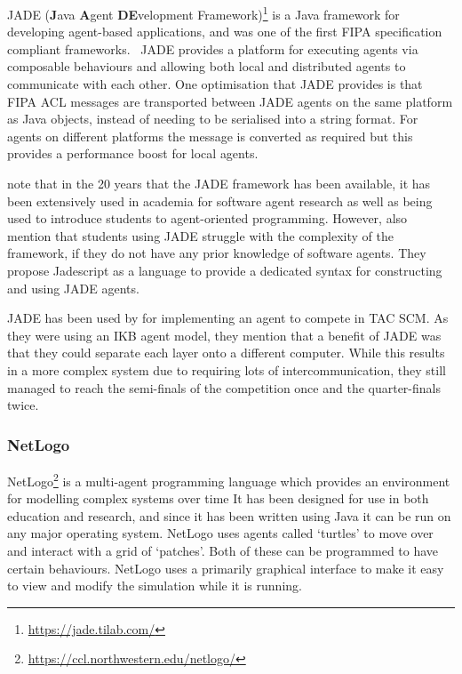 JADE (\textbf{J}ava \textbf{A}gent \textbf{DE}velopment Framework)\footnote{\url{https://jade.tilab.com/}} is a Java framework for developing agent-based applications, and was one of the first FIPA specification compliant frameworks.~\cite{bellifemine1999jade}
JADE provides a platform for executing agents via composable behaviours and allowing both local and distributed agents to communicate with each other.
One optimisation that JADE provides is that FIPA ACL messages are transported between JADE agents on the same platform as Java objects, instead of needing to be serialised into a string format.
For agents on different platforms the message is converted as required but this provides a performance boost for local agents.

 note that in the 20 years that the JADE framework has been available, it has been extensively used in academia for software agent research as well as being used to introduce students to agent-oriented programming.
However,  also mention that students using JADE struggle with the complexity of the framework, if they do not have any prior knowledge of software agents.
They propose Jadescript as a language to provide a dedicated syntax for constructing and using JADE agents.

JADE has been used by  for implementing an agent to compete in TAC SCM\@.
As they were using an IKB agent model, they mention that a benefit of JADE was that they could separate each layer onto a different computer.
While this results in a more complex system due to requiring lots of intercommunication, they still managed to reach the semi-finals of the competition once and the quarter-finals twice.~\cite{collins2009flexible}

\subsubsection{NetLogo}

NetLogo\footnote{\url{https://ccl.northwestern.edu/netlogo/}} is a multi-agent programming language which provides an environment for modelling complex systems over time
It has been designed for use in both education and research, and since it has been written using Java it can be run on any major operating system.
NetLogo uses agents called `turtles' to move over and interact with a grid of `patches'.
Both of these can be programmed to have certain behaviours.
NetLogo uses a primarily graphical interface to make it easy to view and modify the simulation while it is running.~\cite{tisue2004netlogo}

